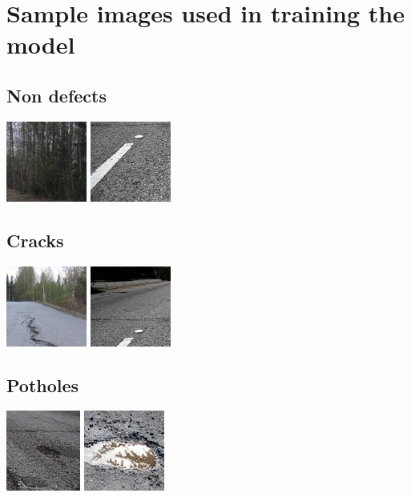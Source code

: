 \documentclass[12pt, letterpaper, twoside]{article}
\begin{document}
\appendix

\section{Sample images used in training the model}\label{app:train_data}

\subsection{Non defects}
\includegraphics{rd1_0.jpg}
\includegraphics{rd2_9.jpg}

\subsection{Cracks}
\includegraphics{rd1_3.jpg}
\includegraphics{rd2_2.jpg}

\subsection{Potholes}
\includegraphics{rd2_5.jpg}
\includegraphics{rd3_9.jpg}
\end{document}
